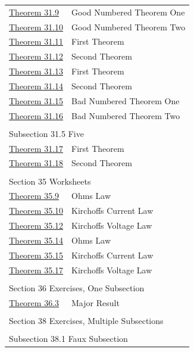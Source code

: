 \documentclass[pdflatex]{sn-jnl}
\theoremstyle{thmstyleone}%
\theoremstyle{thmstyletwo}%
\theoremstyle{thmstylethree}%
\numberwithin{equation}{section}
\begin{document}
\begin{appendices}
\begin{longtable}[l]{ll}
\hyperref[theorem-good-one]{Theorem 31.9}& Good Numbered Theorem One\\
\hyperref[theorem-good-two]{Theorem 31.10}& Good Numbered Theorem Two\\
\hyperref[theorem-number-09]{Theorem 31.11}& First Theorem\\
\hyperref[theorem-number-10]{Theorem 31.12}& Second Theorem\\
\hyperref[theorem-number-11]{Theorem 31.13}& First Theorem\\
\hyperref[theorem-number-12]{Theorem 31.14}& Second Theorem\\
\hyperref[theorem-bad-one]{Theorem 31.15}& Bad Numbered Theorem One\\
\hyperref[theorem-bad-two]{Theorem 31.16}& Bad Numbered Theorem Two\\
\multicolumn{2}{l}{\null}\\[1.5ex] \multicolumn{2}{l}{\large Subsection 31.5 Five}\\[0.5ex]
\hyperref[theorem-number-13]{Theorem 31.17}& First Theorem\\
\hyperref[theorem-number-14]{Theorem 31.18}& Second Theorem\\
\multicolumn{2}{l}{\null}\\[1.5ex] \multicolumn{2}{l}{\large Section 35 Worksheets}\\[0.5ex]
\hyperref[worksheet-networks-2-3]{Theorem 35.9}& Ohms Law\\
\hyperref[worksheet-networks-2-4]{Theorem 35.10}& Kirchoffs Current Law\\
\hyperref[worksheet-networks-2-6]{Theorem 35.12}& Kirchoffs Voltage Law\\
\hyperref[worksheet-networks-pages-2-3]{Theorem 35.14}& Ohms Law\\
\hyperref[worksheet-networks-pages-2-4]{Theorem 35.15}& Kirchoffs Current Law\\
\hyperref[worksheet-networks-pages-2-6]{Theorem 35.17}& Kirchoffs Voltage Law\\
\multicolumn{2}{l}{\null}\\[1.5ex] \multicolumn{2}{l}{\large Section 36 Exercises, One Subsection}\\[0.5ex]
\hyperref[section-exercises-single-8]{Theorem 36.3}& Major Result\\
\multicolumn{2}{l}{\null}\\[1.5ex] \multicolumn{2}{l}{\large Section 38 Exercises, Multiple Subsections}\\[0.5ex]
\multicolumn{2}{l}{\null}\\[1.5ex] \multicolumn{2}{l}{\large Subsection 38.1 Faux Subsection}\\[0.5ex]

\end{longtable}
\end{appendices}
\end{document}
